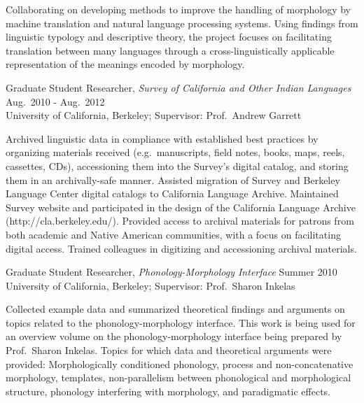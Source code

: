 \documentclass[11pt]{article}
\renewcommand{\it}[1]{\textit{#1}}
\newenvironment{myindentpar}[1]%
 {\begin{list}{}%
         {\setlength{\leftmargin}{#1}}%
         \item[]%
 }
 {\end{list}}
\begin{document}
\begin{myindentpar}{0.45in}
Collaborating on developing methods to improve the handling of morphology by machine translation and natural language processing systems. Using findings from linguistic typology and descriptive theory, the project focuses on facilitating translation between many languages through a cross-linguistically applicable representation of the meanings encoded by morphology. 
\end{myindentpar}

\noindent Graduate Student Researcher, \it{Survey of California and Other Indian Languages} \hfill Aug.~2010 - Aug.~2012 \\
\noindent University of California, Berkeley; Supervisor: Prof.~Andrew Garrett

\begin{myindentpar}{0.45in}
Archived linguistic data in compliance with established best practices by organizing materials received (e.g.~manuscripts, field notes, books, maps, reels, cassettes, CDs), accessioning them into the Survey's digital catalog, and storing them in an archivally-safe manner. Assisted migration of Survey and Berkeley Language Center digital catalogs to California Language Archive. Maintained Survey website and participated in the design of the California Language Archive (http://cla.berkeley.edu/). Provided access to archival materials for patrons from both academic and Native American communities, with a focus on facilitating digital access. Trained colleagues in digitizing and accessioning archival materials.
\end{myindentpar}

\noindent Graduate Student Researcher, \it{Phonology-Morphology Interface} \hfill Summer 2010 \\
\noindent University of California, Berkeley; Supervisor: Prof.~Sharon Inkelas

\begin{myindentpar}{0.45in}
Collected example data and summarized theoretical findings and arguments on topics related to the phonology-morphology interface. This work is being used for an overview volume on the phonology-morphology interface being prepared by Prof.~Sharon Inkelas. Topics for which data and theoretical arguments were provided: Morphologically conditioned phonology, process and non-concatenative morphology, templates, non-parallelism between phonological and morphological structure, phonology interfering with morphology, and paradigmatic effects.
\end{myindentpar}
\end{document}

